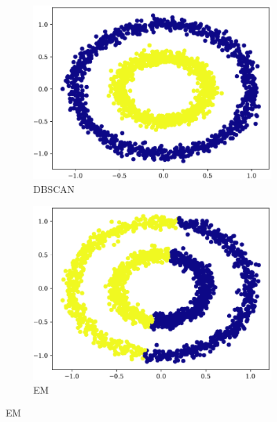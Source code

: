 \begin{figure}[t!]
    \begin{subfigure}[b]{0.45\textwidth}
        \includegraphics[width=\textwidth]{../plots/circle_dbscan.pdf}
        \caption{DBSCAN}
        \label{subfig:circle-dbscan}
    \end{subfigure}
    \hspace{0.09\textwidth}
    \begin{subfigure}[b]{0.45\textwidth}
        \includegraphics[width=\textwidth]{../plots/circle_em.pdf}
        \caption{EM}
        \label{subfig:circle-em}
    \end{subfigure}
\end{figure}

